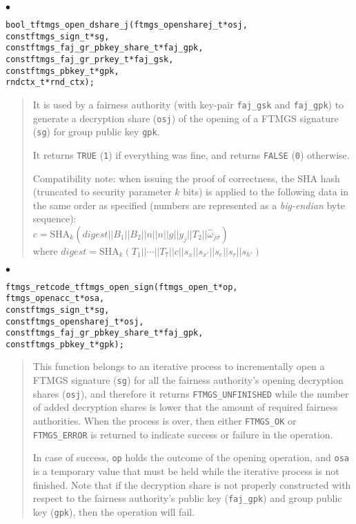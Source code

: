 \documentclass[a4paper]{article}
\newenvironment{api}%
{\noindent$\bullet$\hfill\begin{minipage}[t]{0.97\linewidth}\footnotesize\begin{alltt}}%
{\end{alltt}\end{minipage}}%
\begin{document}
\begin{api}
bool_t ftmgs_open_dshare_j(ftmgs_opensharej_t* osj,
                         const ftmgs_sign_t* sg,
                         const ftmgs_faj_gr_pbkey_share_t* faj_gpk,
                         const ftmgs_faj_gr_prkey_t* faj_gsk,
                         const ftmgs_pbkey_t* gpk,
                         rndctx_t* rnd_ctx);
\end{api}
\begin{quote}\footnotesize
It is used by a fairness authority (with key-pair \verb|faj_gsk| and
\verb|faj_gpk|) to generate a decryption share (\verb|osj|) of the
opening of a FTMGS signature (\verb|sg|) for group public key
\verb|gpk|.

It returns \verb|TRUE| (\verb|1|) if everything was fine, and returns
\verb|FALSE| (\verb|0|) otherwise.

Compatibility note: when issuing the proof of correctness, the SHA hash
(truncated to security parameter $k$ bits) is applied to the following
data in the same order as specified (numbers are represented as a
\emph{big-endian} byte sequence):\\ {$c =
  \mathrm{SHA}_k(\mathit{digest}||B_1||B_2||n||n||g||y_j||T_2||\hat{\omega}_{j\sigma})$}
\\ where 
$\mathit{digest} = \mathrm{SHA}_k(T_1||\cdots||T_7||c||s_x||s_{x'}||s_e||s_r||s_{h'})$
\end{quote}
\begin{api}
ftmgs_retcode_t ftmgs_open_sign(ftmgs_open_t* op,
                                ftmgs_openacc_t* osa,
                                const ftmgs_sign_t* sg,
                                const ftmgs_opensharej_t* osj,
                                const ftmgs_faj_gr_pbkey_share_t* faj_gpk,
                                const ftmgs_pbkey_t* gpk);
\end{api}
\begin{quote}\footnotesize
This function belongs to an iterative process to incrementally open a
FTMGS signature (\verb|sg|) for all the fairness authority's opening
decryption shares (\verb|osj|), and therefore it returns
\verb|FTMGS_UNFINISHED| while the number of added decryption shares is
lower that the amount of required fairness authorities. When the
process is over, then either \verb|FTMGS_OK| or \verb|FTMGS_ERROR| is
returned to indicate success or failure in the operation.

In case of success, \verb|op| holds the outcome of the opening
operation, and \verb|osa| is a temporary value that must be held while
the iterative process is not finished. Note that if the decryption
share is not properly constructed with respect to the fairness
authority's public key (\verb|faj_gpk|) and group public key
(\verb|gpk|), then the operation will fail.
\end{quote}
\end{document}
